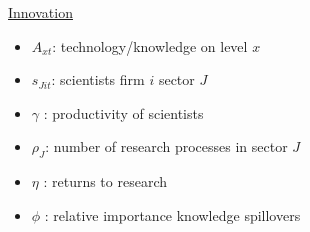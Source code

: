 \documentclass[11pt,aspectratio=169]{beamer}
\begin{document}
\begin{frame}{\hyperlink{modma}{Innovation}}
\begin{minipage}[t!]{0.46\textwidth}
	\begin{itemize}
		\item[] $A_{xt}$: technology/knowledge on level $x$
		\vspace{-7mm}		
		\item[] $s_{Jit}$: scientists firm $i$ sector $J$
		\vspace{-2mm}
		\item[] $\gamma$ : productivity of scientists
	\end{itemize}
\end{minipage}
\hspace{-5mm}
\vspace{-5mm}
\begin{minipage}[t!]{0.54\textwidth}
	\vspace{0mm}
	\begin{itemize}	
		\item[] {$\rho_J$: number of research processes in sector $J$}
		\vspace{-2mm}			
		\item[] $\eta$ : returns to research
		\vspace{-2mm}			
		\item[] $\phi$ : relative importance knowledge spillovers
	\end{itemize}
\end{minipage}
\end{frame}
\end{document}
